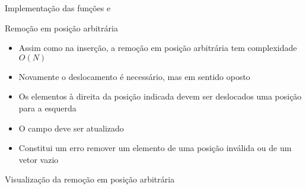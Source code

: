 \begin{frame}[fragile]{Implementação das funções  e }
\end{frame}

\begin{frame}[fragile]{Remoção em posição arbitrária}

    \begin{itemize}
        \item Assim como na inserção, a remoção em posição arbitrária tem complexidade
        $O(N)$

        \item Novamente o deslocamento é necessário, mas em sentido oposto

        \item Os elementos à direita da posição indicada devem ser deslocados uma posição para a
            esquerda

        \item O campo  deve ser atualizado

        \item Constitui um erro remover um elemento de uma posição inválida ou de um vetor
        vazio
    \end{itemize}

\end{frame}

\begin{frame}[fragile]{Visualização da remoção em posição arbitrária}


\end{frame}

